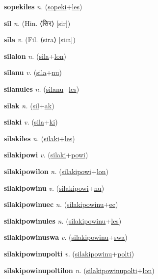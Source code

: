 \textbf{\hypertarget{sopekiles}{sopekiles}} \textit{n.} (\hyperlink{sopeki}{sopeki}+\allowbreak \hyperlink{les}{les})


\textbf{\hypertarget{sil}{sil}} \textit{n.} (Hin. ⟨{\devanagari{}सिर}⟩ [sir])


\textbf{\hypertarget{sila}{sila}} \textit{v.} (Fil. ⟨sira⟩ [siɾa])


\textbf{\hypertarget{silalon}{silalon}} \textit{n.} (\hyperlink{sila}{sila}+\allowbreak \hyperlink{lon}{lon})


\textbf{\hypertarget{silanu}{silanu}} \textit{v.} (\hyperlink{sila}{sila}+\allowbreak \hyperlink{nu}{nu})


\textbf{\hypertarget{silanules}{silanules}} \textit{n.} (\hyperlink{silanu}{silanu}+\allowbreak \hyperlink{les}{les})


\textbf{\hypertarget{silak}{silak}} \textit{n.} (\hyperlink{sil}{sil}+\allowbreak \hyperlink{ak}{ak})


\textbf{\hypertarget{silaki}{silaki}} \textit{v.} (\hyperlink{sila}{sila}+\allowbreak \hyperlink{ki}{ki})


\textbf{\hypertarget{silakiles}{silakiles}} \textit{n.} (\hyperlink{silaki}{silaki}+\allowbreak \hyperlink{les}{les})


\textbf{\hypertarget{silakipowi}{silakipowi}} \textit{v.} (\hyperlink{silaki}{silaki}+\allowbreak \hyperlink{powi}{powi})


\textbf{\hypertarget{silakipowilon}{silakipowilon}} \textit{n.} (\hyperlink{silakipowi}{silakipowi}+\allowbreak \hyperlink{lon}{lon})


\textbf{\hypertarget{silakipowinu}{silakipowinu}} \textit{v.} (\hyperlink{silakipowi}{silakipowi}+\allowbreak \hyperlink{nu}{nu})


\textbf{\hypertarget{silakipowinuec}{silakipowinuec}} \textit{n.} (\hyperlink{silakipowinu}{silakipowinu}+\allowbreak \hyperlink{ec}{ec})


\textbf{\hypertarget{silakipowinules}{silakipowinules}} \textit{n.} (\hyperlink{silakipowinu}{silakipowinu}+\allowbreak \hyperlink{les}{les})


\textbf{\hypertarget{silakipowinuswa}{silakipowinuswa}} \textit{v.} (\hyperlink{silakipowinu}{silakipowinu}+\allowbreak \hyperlink{swa}{swa})


\textbf{\hypertarget{silakipowinupolti}{silakipowinupolti}} \textit{v.} (\hyperlink{silakipowinu}{silakipowinu}+\allowbreak \hyperlink{polti}{polti})


\textbf{\hypertarget{silakipowinupoltilon}{silakipowinupoltilon}} \textit{n.} (\hyperlink{silakipowinupolti}{silakipowinupolti}+\allowbreak \hyperlink{lon}{lon})


